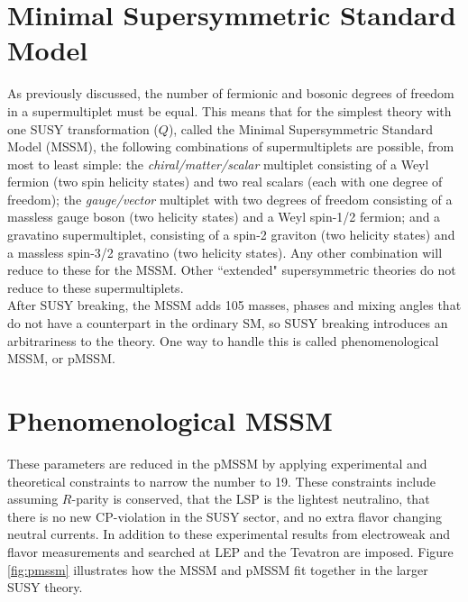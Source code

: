 

\section{Minimal Supersymmetric Standard Model} %


As previously discussed, the number of fermionic and bosonic degrees of freedom in a supermultiplet must be equal.  This means that for the simplest theory with one SUSY transformation ($Q$), called the Minimal Supersymmetric Standard Model (MSSM)\cite{Djouadi:1998di}, the following combinations of supermultiplets are possible, from most to least simple: the \textit{chiral/matter/scalar} multiplet consisting of a Weyl fermion (two spin helicity states) and two real scalars (each with one degree of freedom); the \textit{gauge/vector} multiplet with two degrees of freedom consisting of a massless gauge boson (two helicity states) and a Weyl spin-1/2 fermion; and a gravatino supermultiplet, consisting of a spin-2 graviton (two helicity states) and a massless spin-3/2 gravatino (two helicity states).  Any other combination will reduce to these for the MSSM.  Other ``extended" supersymmetric theories do not reduce to these supermultiplets.  \\

After SUSY breaking, the MSSM adds 105 masses, phases and mixing angles that do not have a counterpart in the ordinary SM, so SUSY breaking introduces an arbitrariness to the theory.  One way to handle this is called phenomenological MSSM, or pMSSM.


\section{Phenomenological MSSM}
\label{sec:pmssm}

These parameters are reduced in the pMSSM\cite{pMSSM} by applying experimental and theoretical constraints to narrow the number to 19.  These constraints include assuming $R$-parity is conserved, that the LSP is the lightest neutralino, that there is no new CP-violation in the SUSY sector, and no extra flavor changing neutral currents.  In addition to these experimental results from electroweak and flavor measurements and searched at LEP and the Tevatron are imposed.  Figure \ref{fig:pmssm} illustrates how the MSSM and pMSSM fit together in the larger SUSY theory. \\

